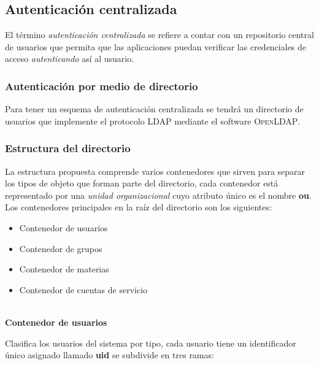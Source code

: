       \subsection {Autenticaci\'{o}n centralizada}

El t\'{e}rmino \textit{autenticaci\'{o}n centralizada} se refiere a contar con un repositorio central de usuarios que permita que las aplicaciones puedan verificar las credenciales de acceso \textit{autenticando} as\'{i} al usuario.

        \subsubsection {Autenticaci\'{o}n por medio de directorio}

Para tener un esquema de autenticaci\'{o}n centralizada se tendr\'{a} un directorio de usuarios que implemente el protocolo LDAP mediante el software \textsc{OpenLDAP}.

        \subsubsection {Estructura del directorio}

La estructura propuesta comprende varios contenedores que sirven para separar los tipos de objeto que forman parte del directorio, cada contenedor est\'{a} representado por una \textit{unidad organizacional} cuyo atributo \'{u}nico es el nombre \textbf{ou}. Los contenedores principales en la ra\'{i}z del directorio son los siguientes:

\begin{itemize}
  \item Contenedor de usuarios
  \item Contenedor de grupos
  \item Contenedor de materias
  \item Contenedor de cuentas de servicio
\end{itemize}

\textbf{\\ Contenedor de usuarios \\}

Clasifica los usuarios del sistema por tipo, cada usuario tiene un identificador \'{u}nico asignado llamado \textbf{uid} se subdivide en tres ramas:

